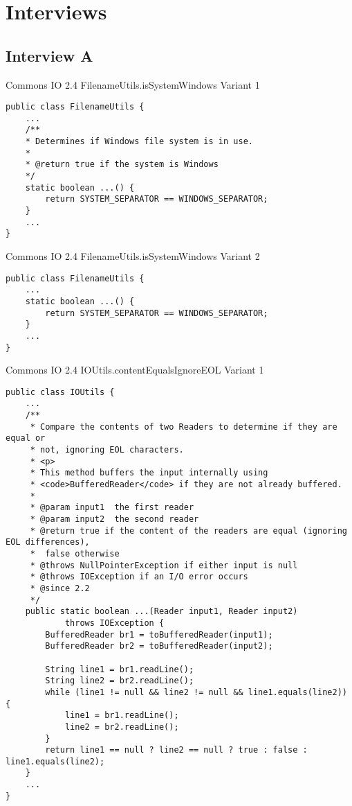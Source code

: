 \section{Interviews}
\label{appendix:interviews}


\subsection{Interview A}

\begin{listing}
\caption{Commons IO 2.4 FilenameUtils.isSystemWindows Variant 1}
\label{lst:filenameutils-issystemwindows-variant1}
\begin{verbatim}
public class FilenameUtils {
	...
	/**
	* Determines if Windows file system is in use.
	* 
	* @return true if the system is Windows
	*/
	static boolean ...() {
		return SYSTEM_SEPARATOR == WINDOWS_SEPARATOR;
	}
	...
}
\end{verbatim}
\end{listing}

\begin{listing}
\caption{Commons IO 2.4 FilenameUtils.isSystemWindows Variant 2}
\label{lst:filenameutils-issystemwindows-variant2}
\begin{verbatim}
public class FilenameUtils {
	...
	static boolean ...() {
		return SYSTEM_SEPARATOR == WINDOWS_SEPARATOR;
	}
	...
}
\end{verbatim}
\end{listing}

\begin{listing}
\caption{Commons IO 2.4 IOUtils.contentEqualsIgnoreEOL Variant 1}
\label{lst:ioutils.contentequalsignoreeol-variant1}
\begin{verbatim}
public class IOUtils {
	...
    /**
     * Compare the contents of two Readers to determine if they are equal or
     * not, ignoring EOL characters.
     * <p>
     * This method buffers the input internally using
     * <code>BufferedReader</code> if they are not already buffered.
     *
     * @param input1  the first reader
     * @param input2  the second reader
     * @return true if the content of the readers are equal (ignoring EOL differences), 
     *	false otherwise
     * @throws NullPointerException if either input is null
     * @throws IOException if an I/O error occurs
     * @since 2.2
     */
    public static boolean ...(Reader input1, Reader input2)
            throws IOException {
        BufferedReader br1 = toBufferedReader(input1);
        BufferedReader br2 = toBufferedReader(input2);

        String line1 = br1.readLine();
        String line2 = br2.readLine();
        while (line1 != null && line2 != null && line1.equals(line2)) {
            line1 = br1.readLine();
            line2 = br2.readLine();
        }
        return line1 == null ? line2 == null ? true : false : line1.equals(line2);
    }
    ...
}
\end{verbatim}
\end{listing}


